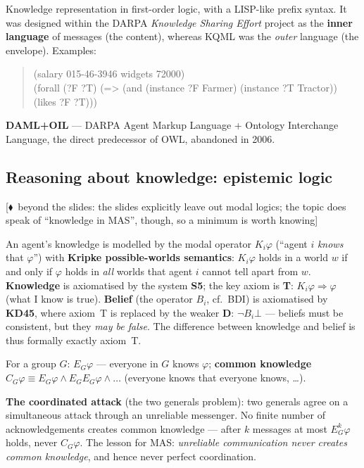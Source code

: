\documentclass[11pt,a4paper]{article}
\theoremstyle{definition}
\providecommand{\uv}[1]{``#1''}
\newcommand{\mimoq}[1]{\textcolor{markcol}{\textsf{\footnotesize[$\blacklozenge$~beyond the slides: #1]}}}
\begin{document}
\begin{defbox}
Knowledge representation in first-order logic, with a LISP-like prefix syntax. It was designed within
the DARPA \emph{Knowledge Sharing Effort} project as the \textbf{inner language} of messages (the
content), whereas KQML was the \emph{outer} language (the envelope). Examples:
\begin{quote}\small\ttfamily
(salary 015-46-3946 widgets 72000)\\
(forall (?F ?T) (=> (and (instance ?F Farmer) (instance ?T Tractor)) (likes ?F ?T)))
\end{quote}
\end{defbox}

\textbf{DAML+OIL} --- DARPA Agent Markup Language + Ontology Interchange Language, the direct
predecessor of OWL, abandoned in 2006.

\subsection{Reasoning about knowledge: epistemic logic}

\noindent\mimoq{the slides explicitly leave out modal logics; the topic does speak of
\uv{knowledge in MAS}, though, so a minimum is worth knowing}

\begin{defbox}
An agent's knowledge is modelled by the modal operator $K_i\varphi$ (\uv{agent $i$ \emph{knows}
that $\varphi$}) with \textbf{Kripke possible-worlds semantics}: $K_i\varphi$ holds in a world
$w$ if and only if $\varphi$ holds in \emph{all} worlds that agent $i$ cannot tell apart from
$w$. \textbf{Knowledge} is axiomatised by the system \textbf{S5}; the key axiom is \textbf{T}:
$K_i\varphi \Rightarrow \varphi$ (what I know is true). \textbf{Belief} (the operator $B_i$,
cf.\ BDI) is axiomatised by \textbf{KD45}, where axiom~T is replaced by the weaker \textbf{D}:
$\neg B_i\bot$ --- beliefs must be consistent, but they \emph{may be false}. The difference
between knowledge and belief is thus formally exactly axiom~T.

For a group $G$: $E_G\varphi$ --- everyone in $G$ knows $\varphi$; \textbf{common knowledge}
$C_G\varphi \equiv E_G\varphi \wedge E_G E_G\varphi \wedge \dots$ (everyone knows that everyone
knows, \dots).

\textbf{The coordinated attack} (the two generals problem): two generals agree on a simultaneous
attack through an unreliable messenger. No finite number of acknowledgements creates common
knowledge --- after $k$ messages at most $E_G^k\varphi$ holds, never $C_G\varphi$. The lesson
for MAS: \emph{unreliable communication never creates common knowledge}, and hence never perfect
coordination.
\end{defbox}
\end{document}
